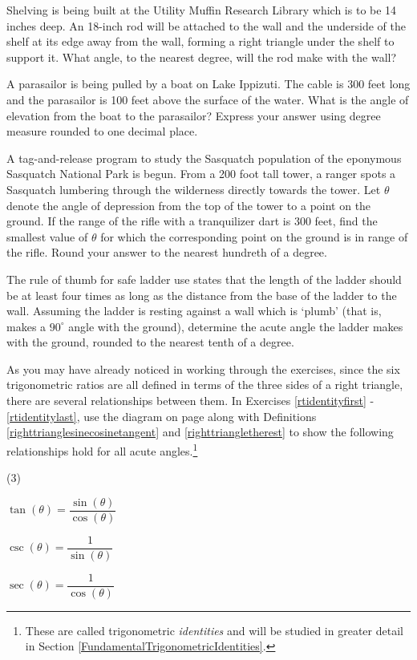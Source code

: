 \begin{tasks}[resume]
\task Shelving is being built at the Utility Muffin Research Library which is to be 14 inches deep.  An 18-inch rod will be attached to the wall and the underside of the shelf at its edge away from the wall, forming a right triangle under the shelf to support it.  What angle, to the nearest degree, will the rod make with the wall?

\task A parasailor is being pulled by a boat on Lake Ippizuti.  The cable is 300 feet long and the parasailor is 100 feet above the surface of the water.  What is the angle of elevation from the boat to the parasailor?  Express your answer using degree measure rounded to one decimal place.

\task  A tag-and-release program to study the Sasquatch population of the eponymous Sasquatch National Park is begun.  From a 200 foot tall tower, a ranger spots a Sasquatch lumbering through the wilderness directly towards the tower.  Let $\theta$ denote the angle of depression from the top of the tower to a point on the ground.  If the range of the rifle with a tranquilizer dart is 300 feet, find the smallest value of $\theta$ for which the corresponding point on the ground is in range of the rifle.  Round your answer to the nearest hundreth of a degree.

\task  The rule of thumb for safe ladder use states that the length of the ladder should be at least four times as long as the distance from the base of the ladder to the wall. Assuming the ladder is resting against a wall which is `plumb' (that is, makes a $90^{\circ}$ angle with the ground), determine the acute angle the ladder makes with the ground, rounded to the nearest tenth of a degree.

\end{tasks}

As you may have already noticed in working through the exercises, since the six trigonometric ratios are all defined in terms of the three sides of a right triangle, there are several relationships between them.  In Exercises \ref{rtidentityfirst} - \ref{rtidentitylast}, use the diagram on page \pageref{righttranglediagram} along with Definitions \ref{righttrianglesinecosinetangent} and \ref{righttriangletherest} to show the following relationships hold for all acute angles.\footnote{These are called trigonometric \textit{identities} and will be studied in greater detail in Section \ref{FundamentalTrigonometricIdentities}.}

\begin{tasks}[resume](3)

\task  $\tan(\theta) = \dfrac{\sin(\theta)}{\cos(\theta)}$ \label{rtidentityfirst}

\task  $\csc(\theta) = \dfrac{1}{\sin(\theta)}$

\task  $\sec(\theta) = \dfrac{1}{\cos(\theta)}$

\end{tasks}

